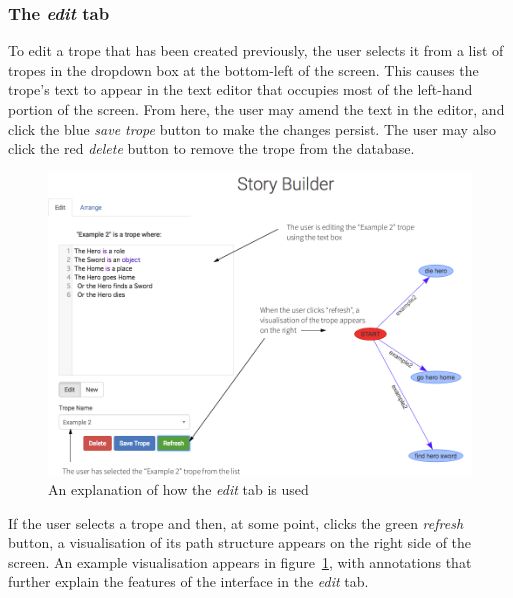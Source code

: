 \documentclass[11pt]{report}
\begin{document}
\subsubsection{The \emph{edit} tab}
To edit a trope that has been created previously, the user selects it from a
list of tropes in the dropdown box at the bottom-left of the screen. This causes
the trope's text to appear in the text editor that occupies most of the
left-hand portion of the screen. From here, the user may amend the text in the
editor, and click the blue \emph{save trope} button to make the changes persist.
The user may also click the red \emph{delete} button to remove the trope from
the database.

\begin{figure}[!ht]
\centerline{\includegraphics[width=\textwidth]{storybuilder-a2.png}}
\caption{An explanation of how the \emph{edit} tab is used}\label{fig:sb-edit-ann2}
\end{figure}

If the user selects a trope and then, at some point, clicks the green
\emph{refresh} button, a visualisation of its path structure appears on the
right side of the screen. An example visualisation appears in
figure~\ref{fig:sb-edit-ann2}, with annotations that further explain the features
of the interface in the \emph{edit} tab.
\end{document}
